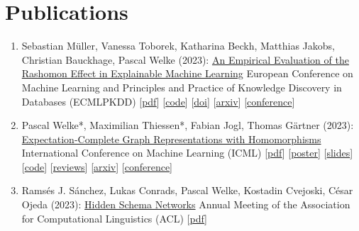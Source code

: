 \documentclass{scrartcl}
\begin{document}
\section{Publications}
\begin{enumerate}
\conti
\item
\label{mueller2023ecml}
Sebastian Müller, Vanessa Toborek, Katharina Beckh, Matthias Jakobs, Christian Bauckhage, Pascal Welke (2023):\newline
\href{https://dx.doi.org/10.1007/978-3-031-43418-1_28}{An Empirical Evaluation of the Rashomon Effect in Explainable Machine Learning}\newline
European Conference on Machine Learning and Principles and Practice of Knowledge Discovery in Databases (ECMLPKDD)\newline
{\footnotesize
[\href{https://pwelke.github.io/publications/mueller2023rashomon.pdf}{pdf}]
[\href{https://github.com/lamarr-xai-group/RashomonEffect}{code}]
[\href{https://dx.doi.org/10.1007/978-3-031-43418-1_28}{doi}]
[\href{https://arxiv.org/abs/2306.15786}{arxiv}]
[\href{https://2023.ecmlpkdd}{conference}]
}
\item
\label{welke2023expectation}
Pascal Welke*, Maximilian Thiessen*, Fabian Jogl, Thomas Gärtner (2023):\newline
\href{https://proceedings.mlr.press/v202/welke23a.html}{Expectation-Complete Graph Representations with Homomorphisms}\newline
International Conference on Machine Learning (ICML)\newline
{\footnotesize
[\href{https://pwelke.github.io/publications/welkethiessen2023expectationcomplete.pdf}{pdf}]
[\href{https://pwelke.github.io/publications/expectation_complete_poster_ICML.pdf}{poster}]
[\href{https://pwelke.github.io/publications/expectation_complete_slides_ICML.pdf}{slides}]
[\href{https://github.com/pwelke/homcount}{code}]
[\href{https://openreview.net/forum?id=ppgRPC14uI}{reviews}]
[\href{https://arxiv.org/abs/2306.05838}{arxiv}]
[\href{https://icml.cc/2023}{conference}]
}
\item
\label{sanchez2023hiddenschema}
Ramsés J. Sánchez, Lukas Conrads, Pascal Welke, Kostadin Cvejoski, César Ojeda (2023):\newline
\href{https://dx.doi.org/10.18653/v1/2023.acl-long.263}{Hidden Schema Networks}\newline
Annual Meeting of the Association for Computational Linguistics (ACL)\newline
{\footnotesize
[\href{https://pwelke.github.io/publications/sanchez2023hiddenschema.pdf}{pdf}]
}
\end{enumerate}
\end{document}
